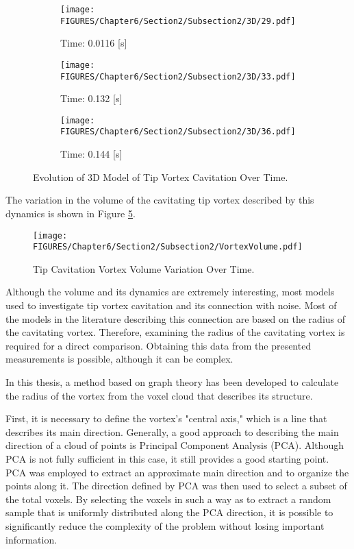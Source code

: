 \begin{figure}[ht]
    \begin{subfigure}{0.32\textwidth}
        \centering
        \texttt{[image: FIGURES/Chapter6/Section2/Subsection2/3D/29.pdf]}
        \caption{Time: 0.0116 [s]}
        \label{fig:figura7}
    \end{subfigure}
    \hfill
    \begin{subfigure}{0.32\textwidth}
        \centering
        \texttt{[image: FIGURES/Chapter6/Section2/Subsection2/3D/33.pdf]}
        \caption{Time: 0.132 [s]}
        \label{fig:figura8}
    \end{subfigure}
    \hfill
    \begin{subfigure}{0.32\textwidth}
        \centering
        \texttt{[image: FIGURES/Chapter6/Section2/Subsection2/3D/36.pdf]}
        \caption{Time: 0.144 [s]}
        \label{fig:figura9}
    \end{subfigure}

    \caption{Evolution of 3D Model of Tip Vortex Cavitation Over Time.}
    \label{fig:3dSnapshot}
\end{figure}

The variation in the volume of the cavitating tip vortex described by this dynamics is shown in Figure \ref{fig:VortexVolume}.

\begin{figure}[ht]
    \centering
    \texttt{[image: FIGURES/Chapter6/Section2/Subsection2/VortexVolume.pdf]}
    \caption{Tip Cavitation Vortex Volume Variation Over Time.}

    \label{fig:VortexVolume}
\end{figure}

Although the volume and its dynamics are extremely interesting, most models used to investigate tip vortex cavitation and its connection with noise.
Most of the models in the literature describing this connection are based on the radius of the cavitating vortex. Therefore, examining the radius of the cavitating vortex is required for a direct comparison.
Obtaining this data from the presented measurements is possible, although it can be complex.

In this thesis, a method based on graph theory has been developed to calculate the radius of the vortex from the voxel cloud that describes its structure.

First, it is necessary to define the vortex's "central axis," which is a line that describes its main direction. 
Generally, a good approach to describing the main direction of a cloud of points is Principal Component Analysis (PCA). Although PCA is not fully sufficient in this case, it still provides a good starting point.
PCA was employed to extract an approximate main direction and to organize the points along it. The direction defined by PCA was then used to select a subset of the total voxels. By selecting the voxels in such a way as to extract a random sample that is uniformly distributed along the PCA direction, it is possible to significantly reduce the complexity of the problem without losing important information.

